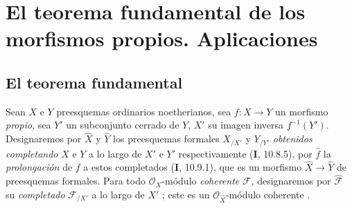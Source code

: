 \section{El teorema fundamental de los morfismos propios. Aplicaciones}
\label{section:III.4}
\label{section:III.4-fr}


\subsection{El teorema fundamental}
\label{subsection:III.4.1}
\label{subsection:III.4.1-fr}

\begin{env}[4.1.1]
\label{III.4.1.1}
\label{III.4.1.1-fr}
Sean $X$ e $Y$ preesquemas ordinarios noetherianos, sea $f:X\to Y$ un
morfismo \emph{propio}, sea $Y'$ un subconjunto cerrado de $Y$, $X'$ su imagen inversa
$f^{-1}(Y')$. Designaremos por $\widehat X$ y $\widehat Y$ los preesquemas formales
$X_{/X'}$ y $Y_{/Y'}$ \emph{obtenidos completando} $X$ e $Y$ a lo largo de
$X'$ e $Y'$ respectivamente (\textbf{I}, 10.8.5), por $\widehat f$ la \emph{prolongación}
de $f$ a estos completados (\textbf{I}, 10.9.1), que es un morfismo
$\widehat X\to\widehat Y$ de preesquemas formales. Para todo
$\mathcal O_X$-módulo \emph{coherente} $\mathcal F$,
designaremos por $\widehat{\mathcal F}$ su \emph{completado} $\mathcal F_{/X'}$ a lo
largo de $X'$ ; este es un
$\mathcal O_{\widehat X}$-módulo coherente .
\end{env}

